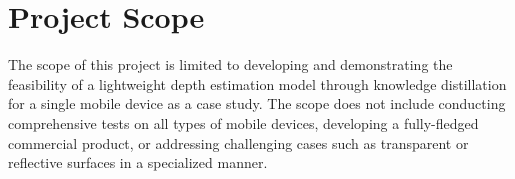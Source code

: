 \section{Project Scope}
\label{sec:project_scope}

The scope of this project is limited to developing and demonstrating the feasibility of a lightweight depth estimation model through knowledge distillation for a single mobile device as a case study. The scope does not include conducting comprehensive tests on all types of mobile devices, developing a fully-fledged commercial product, or addressing challenging cases such as transparent or reflective surfaces in a specialized manner.